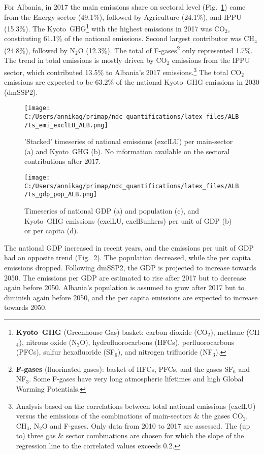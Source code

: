 \documentclass[12pt]{article}
\begin{document}
 For Albania, in 2017 the main emissions share on sectoral level (Fig.~\ref{fig:tsEmi}) came from the Energy sector (49.1\%), followed by Agriculture (24.1\%), and IPPU (15.3\%). 
 The Kyoto~GHG\footnote{\textbf{Kyoto~GHG} (Greenhouse Gas) basket: carbon dioxide (CO$_2$), methane (CH$_4$), nitrous oxide (N$_2$O), hydrofluorocarbons (HFCs), perfluorocarbons (PFCs), sulfur hexafluoride (SF$_6$), and nitrogen trifluoride (NF$_3$).} with the highest emissions in 2017 was CO$_2$, constituting  61.1\% of the national emissions. 
 Second largest contributor was CH$_4$ (24.8\%), followed by N$_2$O (12.3\%). 
 The total of F-gases\footnote{\textbf{F-gases} (fluorinated gases): basket of HFCs, PFCs, and the gases SF$_6$ and NF$_3$. 
 Some F-gases have very long atmospheric lifetimes and high Global Warming Potentials.} only represented 1.7\%.
 The trend in total emissions is mostly driven by CO$_2$ emissions from the IPPU sector, which contributed 13.5\% to Albania's 2017 emissions.\footnote{Analysis based on the correlations between total national emissions (exclLU) versus the emissions of the combinations of main-sectors \& the gases CO$_2$, CH$_4$, N$_2$O and F-gases. 
 Only data from 2010 to 2017 are assessed. 
 The (up to) three gas \& sector combinations are chosen for which the slope of the regression line to the correlated values exceeds 0.2.}
 The total CO$_2$ emissions are expected to be 63.2\% of the national Kyoto~GHG emissions in 2030 (dmSSP2).
 \begin{figure}[htbp]
 \centering
 \texttt{[image: C:/Users/annikag/primap/ndc\_quantifications/latex\_files/ALB/ts\_emi\_exclLU\_ALB.png]}
 \caption{'Stacked' timeseries of national emissions (exclLU) per main-sector (a) and Kyoto~GHG (b). 
 No information available on the sectoral contributions after 2017.}
 \label{fig:tsEmi}
 \end{figure}
 \begin{figure}[htbp]
 \centering
 \texttt{[image: C:/Users/annikag/primap/ndc\_quantifications/latex\_files/ALB/ts\_gdp\_pop\_ALB.png]}
 \caption{Timeseries of national GDP (a) and population (c), and Kyoto~GHG emissions (exclLU, exclBunkers) per unit of GDP (b) or per capita (d).}
 \label{fig:tsSocioEco}
 \end{figure}

 The national GDP increased in recent years, and the emissions per unit of GDP had an opposite trend (Fig.~\ref{fig:tsSocioEco}).
 The population decreased, while the per capita emissions dropped. 
 Following dmSSP2, the GDP is projected to increase towards 2050. 
 The emissions per GDP are estimated to rise after 2017 but to decrease again before 2050. 
 Albania's population is assumed to grow after 2017 but to diminish again before 2050, and the per capita emissions are expected to increase towards 2050. 
\end{document}
